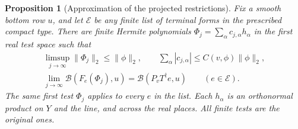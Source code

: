 \documentclass[a4paper,11pt]{article}
\newtheorem{proposition}{Proposition}[section]
\theoremstyle{definition}
\theoremstyle{remark}
\numberwithin{equation}{section}
\begin{document}
\begin{proposition}[Approximation of the projected restrictions]\leavevmode
\label{prop:projecttests260}
Fix a smooth bottom row \(u\), and let \(\mathcal E\) be any
finite list of terminal forms in the prescribed compact type.
There are finite Hermite polynomials \(\Phi_j=\sum_\alpha
c_{j,\alpha}h_\alpha\) in the first real test space such that
\[
 \begin{gathered}
 \limsup_{j\to\infty}\|\Phi_j\|_2\le\|\phi\|_2,\qquad
 \sum_\alpha|c_{j,\alpha}|\le C(v,\phi)\|\phi\|_2,\\
 \lim_{j\to\infty}\mathcal B(F_e(\Phi_j),u)
       =\mathcal B(P_vT^\dagger e,u)\qquad(e\in\mathcal E).
 \end{gathered}
\]
The same first test \(\Phi_j\) applies to every \(e\) in the
list. Each \(h_\alpha\) is an orthonormal product on \(Y\) and
the line, and across the real places. All finite tests are the
original ones.
\end{proposition}
\end{document}
